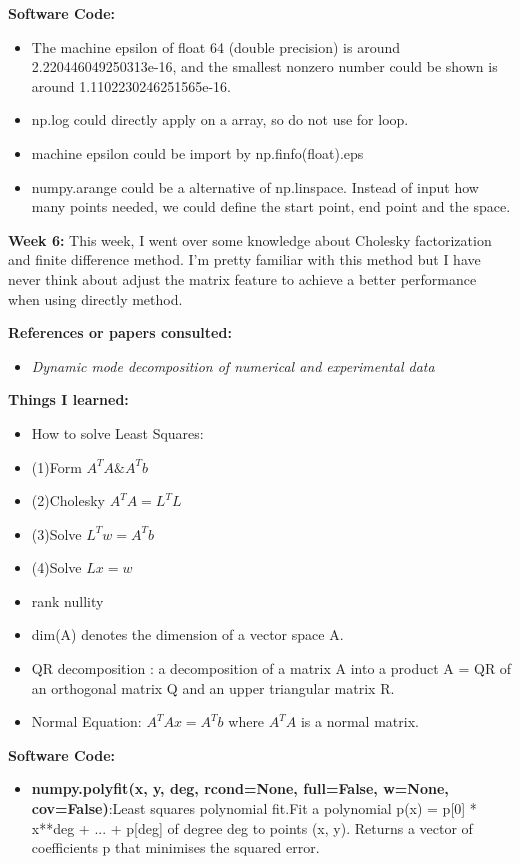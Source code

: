 \documentclass{article}
\begin{document}
\textbf{Software Code:}
\begin{itemize}
\item The machine epsilon of float 64 (double precision) is around 2.220446049250313e-16, and the smallest nonzero number could be shown is around 1.1102230246251565e-16.
\item np.log could directly apply on a array, so do not use for loop.
\item machine epsilon could be import by np.finfo(float).eps
\item numpy.arange could be a alternative of np.linspace. Instead of input how many points needed, we could define the start point, end point and the space.
\end{itemize}

\newpage
\textbf{Week 6:}
This week, I went over some knowledge about Cholesky factorization and finite difference method. I'm pretty familiar with this method but I have never think about adjust the matrix feature to achieve a better performance when using directly method.

\textbf{References or papers consulted:}
\begin{itemize}

\item {\em Dynamic mode decomposition of numerical and experimental data}

\end{itemize}

\textbf{Things I learned:}
\begin{itemize}
\item How to solve Least Squares:
\item (1)Form $ A^T A \& A^Tb$
\item (2)Cholesky $ A^T A = L^TL$
\item (3)Solve $ L^Tw = A^Tb$
\item (4)Solve $ Lx = w$
\item rank nullity
\item dim(A) denotes the dimension of a vector space A.
\item QR decomposition : a decomposition of a matrix A into a product A = QR of an orthogonal matrix Q and an upper triangular matrix R.
\item Normal Equation: $ A^T Ax = A^Tb$ where $A^TA$ is a normal matrix. 
\end{itemize}

\textbf{Software Code:}
\begin{itemize}
\item \textbf{numpy.polyfit(x, y, deg, rcond=None, full=False, w=None, cov=False)}:Least squares polynomial fit.Fit a polynomial p(x) = p[0] * x**deg + ... + p[deg] of degree deg to points (x, y). Returns a vector of coefficients p that minimises the squared error.

\end{itemize}
\end{document}
